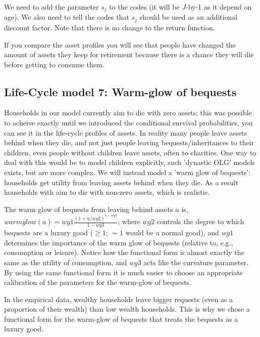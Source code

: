 We need to add the parameter $s_j$ to the codes (it will be $J$-by-1 as it depend on age). We also need to tell the codes that $s_j$ should be used as an additional discount factor. Note that there is no change to the return function.

If you compare the asset profiles you will see that people have changed the amount of assets they keep for retirement because there is a chance they will die before getting to consume them.

\subsection{Life-Cycle model 7: Warm-glow of bequests}
Households in our model currently aim to die with zero assets; this was possible to acheive exactly until we introduced the conditional survival probabilities, you can see it in the life-cycle profiles of assets. In reality many people leave assets behind when they die, and not just people leaving bequests/inheritances to their children, even people without children leave assets, often to charities. One way to deal with this would be to model children explicitly, such 'dynastic OLG' models exists, but are more complex. We will instead model a 'warm glow of bequests': households get utility from leaving assets behind when they die. As a result households with aim to die with non-zero assets, which is realistic.

The warm glow of bequests from leaving behind assets $a$ is, $warmglow(a)=wg1 \frac{(1+a/wg2)^{1-wg3}}{1-wg3}$; where $wg2$ controls the degree to which bequests are a luxury good ($\geq 1$; $=1$ would be a normal good), and $wg1$ determines the importance of the warm glow of bequests (relative to, e.g., consumption or leisure). Notice how the functional form is almost exactly the same as the utility of consumption, and $wg3$ acts like the curvature parameter. By using the same functional form it is much easier to choose an appropriate calibration of the parameters for the warm-glow of bequests.

In the empirical data, wealthy households leave bigger requests (even as a proportion of their wealth) than low wealth households. This is why we chose a functional form for the warm-glow of bequests that treats the bequests as a luxury good.

